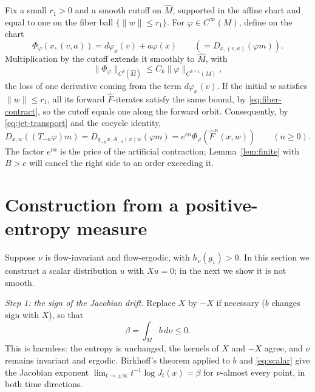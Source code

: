 \documentclass[12pt]{article}
\theoremstyle{remark}
\begin{document}
Fix a small \(r_1>0\) and a smooth cutoff on \(\widehat M\),
supported in the affine chart and equal to one on the fiber ball
\(\{\|w\|\le r_1\}\).  For \(\varphi\in C^\infty(M)\), define on the
chart
\[
 \Phi_\varphi(x,(v,a))=d\varphi_x(v)+a\varphi(x)
 \qquad(=D_{x,(v,a)}(\varphi m)).
\]
Multiplication by the cutoff extends it smoothly to \(\widehat M\),
with
\begin{equation}\label{eq:observable-norm}
 \|\Phi_\varphi\|_{C^k(\widehat M)}
                  \le C_k\|\varphi\|_{C^{k+1}(M)},
\end{equation}
the loss of one derivative coming from the term \(d\varphi_x(v)\).
If the initial \(w\) satisfies \(\|w\|\le r_1\), all its forward
\(\widehat F\)-iterates satisfy the same bound, by
\eqref{eq:fiber-contract}, so the cutoff equals one along the forward
orbit.  Consequently, by \eqref{eq:jet-transport}
and the cocycle identity,
\begin{equation}\label{eq:recover-jet}
 D_{x,w}((T_{-n}\varphi)m)
      =D_{g_{-n}x,A_{-n}(x)w}(\varphi m)
      =e^{cn}\Phi_\varphi(\widehat F^n(x,w))\qquad(n\ge0).
\end{equation}
The factor \(e^{cn}\) is the price of the artificial contraction;
Lemma~\ref{lem:finite} with \(B>c\) will cancel the right side to an
order exceeding it.

\section{Construction from a positive-entropy measure}
\label{sec:construction}

Suppose \(\nu\) is flow-invariant and flow-ergodic, with
\(h_\nu(g_1)>0\).  In this section we construct a scalar distribution
\(u\) with \(Xu=0\); in the next we show it is not smooth.

\emph{Step 1: the sign of the Jacobian drift.}
Replace \(X\) by \(-X\) if necessary (\(b\) changes sign with
\(X\)), so that
\begin{equation}\label{eq:beta}
 \beta=\int_M b\,d\nu\le0.
\end{equation}
This is harmless: the entropy is unchanged, the kernels of \(X\) and
\(-X\) agree, and \(\nu\) remains invariant and ergodic.
Birkhoff's theorem applied to \(b\) and \eqref{eq:scalar} give the
Jacobian exponent \(\lim_{t\to\pm\infty}t^{-1}\log J_t(x)=\beta\) for
\(\nu\)-almost every point, in both time directions.
\end{document}
